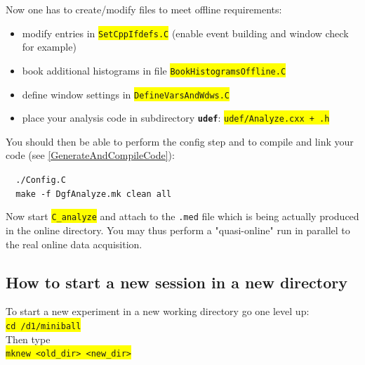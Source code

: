 \documentclass[10pt]{article}
\newcommand{\yellow}[1]{\colorbox{yellow}{\texttt{#1}}}
\newcommand{\boldt}[1]{\textbf{\texttt{#1}}}
\newenvironment{blueboxed}
	{\begin{Sbox}\begin{minipage}[t]}
	{\end{minipage}\end{Sbox}\colorbox{lightblue}{\TheSbox}}
\begin{document}
Now one has to create/modify files to meet offline requirements:
\begin{center}
\begin{itemize}
\setlength{\rightmargin}{1em}%
\setlength{\leftmargin}{2em}%
\setlength{\itemsep}{0pt}%
\setlength{\parskip}{1mm}%
\setlength{\partopsep}{0pt}%
\setlength{\parsep}{0pt}%
\setlength{\topsep}{0pt}%
\item	modify entries in \yellow{SetCppIfdefs.C} (enable event building and window check for example)
\item	book additional histograms in file \yellow{BookHistogramsOffline.C}
\item	define window settings in \yellow{DefineVarsAndWdws.C}
\item	place your analysis code in subdirectory \boldt{udef}: \yellow{udef/Analyze.cxx + .h}
\end{itemize}
\end{center}

You should then be able to perform the config step and to compile and link your code (see \ref{GenerateAndCompileCode}):
\begin{center}
\begin{blueboxed}{.75\linewidth}
\verb+	./Config.C+\\
\verb+	make -f DgfAnalyze.mk clean all+
\end{blueboxed}
\end{center}

Now start \yellow{C\_analyze} and attach to the \texttt{.med} file which is being actually produced in the online directory.
You may thus perform a "quasi-online" run in parallel to the real online data acquisition.
\newpage
\subsection{How to start a new session in a new directory}\label{CreateNewDir}\vspace{3mm}

To start a new experiment in a new working directory go one level up:\\

\hspace*{.2\linewidth}\yellow{cd /d1/miniball}\\

Then type\\

\hspace*{.2\linewidth}\yellow{mknew <old\_dir> <new\_dir>}\\
\end{document}

